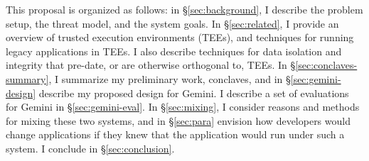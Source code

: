 This proposal is organized as follows: in \S\ref{sec:background}, I describe
the problem setup, the threat model, and the system goals.
%
In \S\ref{sec:related}, I provide an overview of trusted execution
environments (TEEs), and techniques for running legacy applications
in TEEs.
%
I also describe techniques for data isolation and integrity that pre-date, or
are otherwise orthogonal to, TEEs.
%
In \S\ref{sec:conclaves-summary}, I summarize my preliminary work,
conclaves, and in \S\ref{sec:gemini-design} describe my proposed design for
Gemini.
%
I describe a set of evaluations for Gemini in \S\ref{sec:gemini-eval}.
%
In \S\ref{sec:mixing}, I consider reasons and methods for mixing these two
systems, and in \S\ref{sec:para} envision how developers would change
applications if they knew that the application would run under such a system.
%
I conclude in \S\ref{sec:conclusion}.
